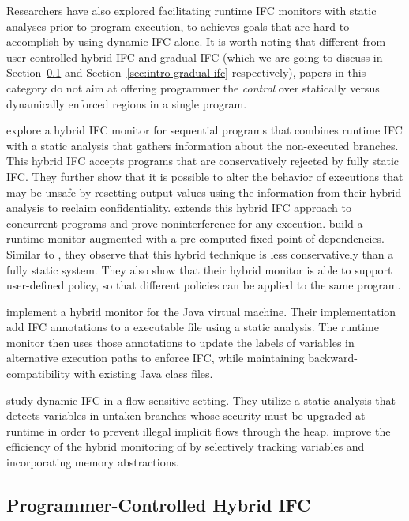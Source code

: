 \documentclass[10pt, letterpaper]{article}
\begin{document}
Researchers have also explored facilitating runtime IFC monitors with static
analyses prior to program execution, to achieves goals that are hard to
accomplish by using dynamic IFC alone. It is worth noting that different from
user-controlled hybrid IFC and gradual IFC (which we are going to discuss in
Section~\ref{sec:intro-hybrid} and Section~\ref{sec:intro-gradual-ifc}
respectively), papers in this category do not aim at offering programmer the
\emph{control} over statically versus dynamically enforced regions in a single
program.

\citet{le2005monitoring} explore a
hybrid IFC monitor for sequential programs that combines runtime IFC with a
static analysis that gathers information about the non-executed branches. This
hybrid IFC accepts programs that are conservatively rejected by fully static
IFC. They further show that it is possible to alter the behavior of executions
that may be unsafe by resetting output values using the information from their
hybrid analysis to reclaim confidentiality. \citet{le2007automaton} extends
this hybrid IFC approach to concurrent programs and prove noninterference for
any execution. \citet{Shroff:2007tg} build a runtime monitor augmented with a
pre-computed fixed point of dependencies. Similar to
\citet{le2005monitoring}, they observe that this hybrid technique is less
conservatively than a fully static system. They also show that their hybrid
monitor is able to support user-defined policy, so that different policies can
be applied to the same program.

\citet{Chandra:2007we} implement a hybrid monitor for the Java virtual
machine. Their implementation add IFC annotations to a executable file using a
static analysis. The runtime monitor then uses those annotations to update the
labels of variables in alternative execution paths to enforce IFC, while
maintaining backward-compatibility with existing Java class files.

\citet{russo2010dynamic} study dynamic IFC in a flow-sensitive setting. They
utilize a static analysis that detects variables in untaken branches whose
security must be upgraded at runtime in order to prevent illegal implicit flows
through the heap. \citet{moore2011static} improve the efficiency of the
hybrid monitoring of \citet{russo2010dynamic} by selectively tracking
variables and incorporating memory abstractions.

\subsection{Programmer-Controlled Hybrid IFC}
\label{sec:intro-hybrid}
\end{document}
